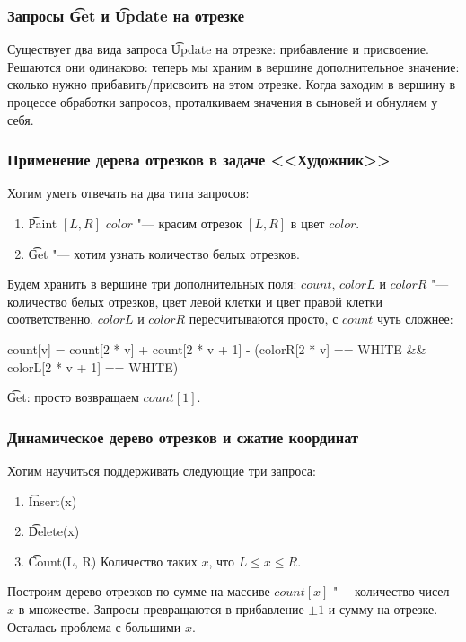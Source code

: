 \subsubsection{Запросы \t{Get} и \t{Update} на отрезке}

Существует два вида запроса \t{Update} на отрезке: прибавление и присвоение.
Решаются они одинаково: теперь мы храним в вершине дополнительное значение: сколько нужно прибавить/присвоить на этом отрезке.
Когда заходим в вершину в процессе обработки запросов, проталкиваем значения в сыновей и обнуляем у себя.

\subsubsection{Применение дерева отрезков в задаче <<Художник>>}

Хотим уметь отвечать на два типа запросов:

\begin{enumerate}
	\item \t{Paint} $[L, R]$ $color$ "--- красим отрезок $[L, R]$ в цвет $color$.
	\item \t{Get} "--- хотим узнать количество белых отрезков.
\end{enumerate}

Будем хранить в вершине три дополнительных поля: $count$, $colorL$ и $colorR$ "--- количество белых отрезков, цвет левой клетки и цвет правой клетки соответственно.
$colorL$ и $colorR$ пересчитываются просто, с $count$ чуть сложнее:
\begin{cppcode}
count[v] = count[2 * v] + count[2 * v + 1]
	- (colorR[2 * v] == WHITE && colorL[2 * v + 1] == WHITE)
\end{cppcode}

\t{Get}: просто возвращаем $count[1]$.

\subsubsection{Динамическое дерево отрезков и сжатие координат}

Хотим научиться поддерживать следующие три запроса:
\begin{enumerate}
	\item \t{Insert(x)}
	\item \t{Delete(x)}
	\item \t{Count(L, R)} Количество таких $x$, что $L \le x \le R$.
\end{enumerate}

Построим дерево отрезков по сумме на массиве $count[x]$ "--- количество чисел $x$ в множестве.
Запросы превращаются в прибавление $\pm 1$ и сумму на отрезке.
Осталась проблема с большими $x$.

